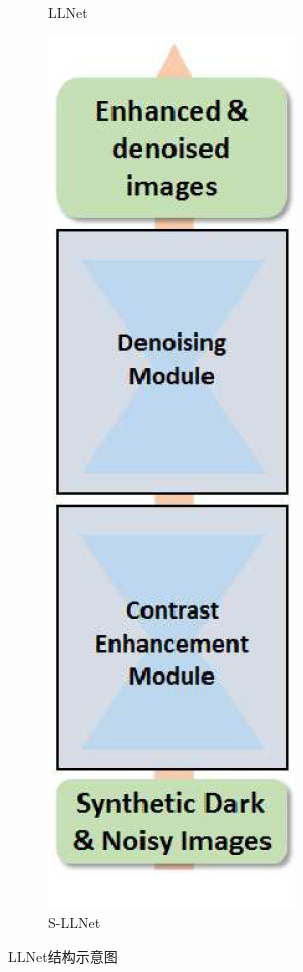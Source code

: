 \documentclass[a4paper, 10pt]{article}
\begin{document}
\begin{figure}[htbp]
\begin{subfigure}{0.18\textwidth}
			\captionsetup{font=scriptsize}
			\caption{LLNet}
			\label{fig: LLNet}
		\end{subfigure}
		\begin{subfigure}{0.175\textwidth}
			\includegraphics[width=\linewidth]{picture/LLIE/LLNet/S-LLNet}
			\captionsetup{font=scriptsize}
			\caption{S-LLNet}
			\label{fig: S-LLNet}	
		\end{subfigure}
		\captionsetup{font=scriptsize}
		\caption{
			\label{fig: LLNet Architecture}
			LLNet结构示意图
		}
	\end{figure}
	
\end{document}
